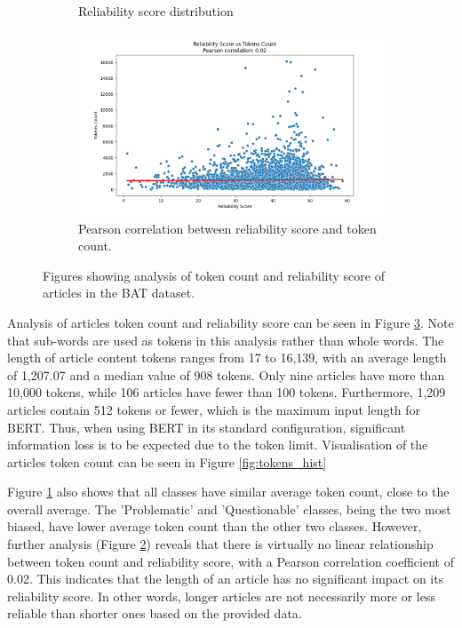 \begin{figure}[htbp]
\begin{subfigure}[b]{0.49\linewidth}
        \caption{Reliability score distribution}
        \label{fig:reliability_score_hist}
    \end{subfigure}
    \begin{subfigure}[b]{0.49\linewidth}
        \includegraphics[width=\linewidth]{figures/correlation_tokens_reliability_score.png}
        \caption{Pearson correlation between reliability score and token count.}
        \label{fig:pearson}
    \end{subfigure}
    \caption{Figures showing analysis of token count and reliability score of articles in the BAT dataset.}
    \label{fig:token_reliability_figs}
\end{figure}

Analysis of articles token count and reliability score can be seen in Figure \ref{fig:token_reliability_figs}. Note that sub-words are used as tokens in this analysis rather than whole words. The length of article content tokens ranges from 17 to 16,139, with an average length of 1,207.07 and a median value of 908 tokens. Only nine articles have more than 10,000 tokens, while 106 articles have fewer than 100 tokens. Furthermore, 1,209 articles contain 512 tokens or fewer, which is the maximum input length for BERT. Thus, when using BERT in its standard configuration, significant information loss is to be expected due to the token limit. Visualisation of the articles token count can be seen in Figure \ref{fig:tokens_hist}

Figure \ref{fig:reliability_score_hist} also shows that all classes have similar average token count, close to the overall average. The 'Problematic' and 'Questionable' classes, being the two most biased, have lower average token count than the other two classes. However, further analysis (Figure \ref{fig:pearson}) reveals that there is virtually no linear relationship between token count and reliability score, with a Pearson correlation coefficient of 0.02. This indicates that the length of an article has no significant impact on its reliability score. In other words, longer articles are not necessarily more or less reliable than shorter ones based on the provided data.


